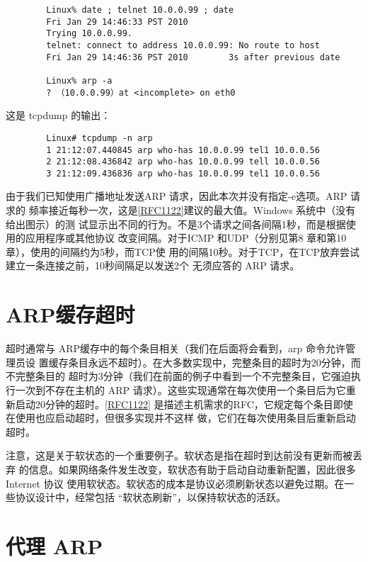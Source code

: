 \begin{verbatim}
        Linux% date ; telnet 10.0.0.99 ; date
        Fri Jan 29 14:46:33 PST 2010
        Trying 10.0.0.99.
        telnet: connect to address 10.0.0.99: No route to host
        Fri Jan 29 14:46:36 PST 2010        3s after previous date

        Linux% arp -a
        ? （10.0.0.99）at <incomplete> on eth0
\end{verbatim}
这是 tcpdump 的输出：
\begin{verbatim}
        Linux# tcpdump -n arp
        1 21:12:07.440845 arp who-has 10.0.0.99 tel1 10.0.0.56
        2 21:12:08.436842 arp who-has 10.0.0.99 tell 10.0.0.56
        3 21:12:09.436836 arp who-has 10.0.0.99 tel1 10.0.0.56
\end{verbatim}

由于我们已知使用广播地址发送ARP 请求，因此本次并没有指定-e选项。ARP 请求的
频率接近每秒一次，这是\href{https://www.rfc-editor.org/rfc/rfc1122}{[RFC1122]}建议的最大值。Windows
系统中（没有给出图示）的测
试显示出不同的行为。不是3个请求之间各间隔1秒，而是根据使用的应用程序或其他协议
改变间隔。对于ICMP 和UDP（分别见第8 章和第10章），使用的间隔约为5秒，而TCP使
用的间隔10秒。对于TCP，在TCP放弃尝试建立一条连接之前，10秒间隔足以发送2个
无须应答的 ARP 请求。

\section{ARP缓存超时}

超时通常与 ARP缓存中的每个条目相关（我们在后面将会看到，arp 命令允许管理员设
置缓存条目永远不超时）。在大多数实现中，完整条目的超时为20分钟，而不完整条目的
超时为3分钟（我们在前面的例子中看到一个不完整条目，它强迫执行一次到不存在主机的
ARP
请求）。这些实现通常在每次使用一个条目后为它重新启动20分钟的超时。\href{https://www.rfc-editor.org/rfc/rfc1122}{[RFC1122]}
是描述主机需求的RFC，它规定每个条目即使在使用也应启动超时，但很多实现并不这样
做，它们在每次使用条目后重新启动超时。

注意，这是关于软状态的一个重要例子。软状态是指在超时到达前没有更新而被丢弃
的信息。如果网络条件发生改变，软状态有助于启动自动重新配置，因此很多 Internet 协议
使用软状态。软状态的成本是协议必须刷新状态以避免过期。在一些协议设计中，经常包括
“软状态刷新”，以保持软状态的活跃。

\section{代理 ARP}

